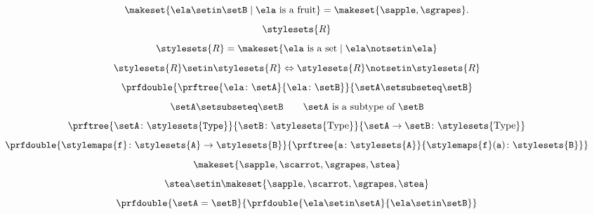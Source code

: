 \begin{forslides}
\begin{equation}
        \label{eq:stat_5_session1_22}
        \makeset{ \ela \setin\setB \mid \ela \text{ is a fruit} } = \makeset{ \sapple, \sgrapes }.
    \end{equation}
    \begin{equation}
        \label{eq:russel_session1_22}
        \stylesets{R}
    \end{equation}
    \begin{equation}
        \label{eq:russel_2_session1_22}
        \stylesets{R}=\makeset{\ela \text{ is a set}\mid \ela \notsetin \ela}
    \end{equation}
    \begin{equation}
        \label{eq:russel_3_session1_22}
        \stylesets{R} \setin \stylesets{R} \Leftrightarrow \stylesets{R} \notsetin \stylesets{R}
    \end{equation}
    \begin{equation}
        \label{eq:types_session1_22}
        \prfdouble{
            \prftree{\ela \colon \setA}{\ela \colon \setB}}{\setA \setsubseteq \setB}
    \end{equation}
    \begin{equation}
        \label{eq:types_2_session1_22}
        \setA \setsubseteq \setB \qquad \setA \text{ is a subtype of }\setB
    \end{equation}
    \begin{equation}
        \label{eq:types_3_session1_22}
        \prftree{\setA\colon \stylesets{\texttt{Type}}}{\setB\colon \stylesets{\text{Type}}}{{\setA\to \setB \colon \stylesets{\text{Type}}}}
    \end{equation}
    \begin{equation}
        \label{eq:types_4_session1_22}
        \prfdouble{
            \stylemaps{\texttt{f}}\colon \stylesets{\texttt{A}}\to \stylesets{\texttt{B}}}{\prftree{\texttt{a}\colon \stylesets{\texttt{A}}}{\stylemaps{\texttt{f}}(\texttt{a})\colon \stylesets{\texttt{B}}}}
    \end{equation}
    \begin{equation}
        \label{eq:1_session1_22}
        \makeset{\sapple,\scarrot,\sgrapes,\stea}
    \end{equation}
    \begin{equation}
        \label{eq:2_session1_22}
        \stea \setin \makeset{\sapple,\scarrot,\sgrapes,\stea}
    \end{equation}
    \begin{equation}
        \label{eq:3_session1_22}
        \prfdouble{
            \setA =\setB}{\prfdouble{\ela \setin \setA}{\ela\setin \setB}}

\end{equation}
\end{forslides}
